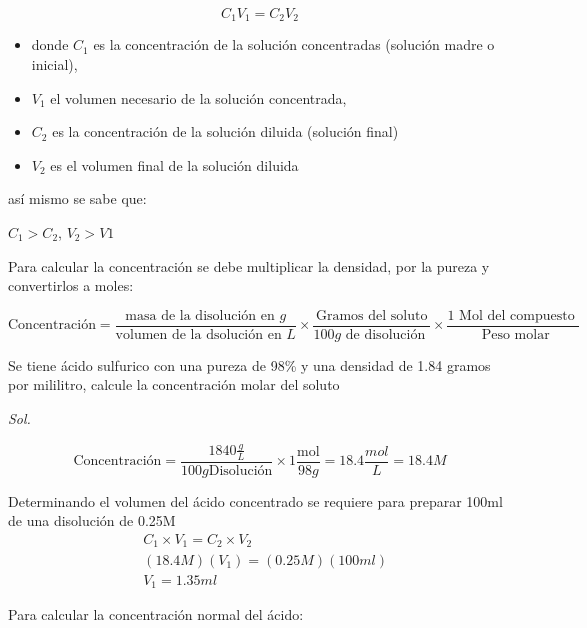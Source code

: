 \begin{equation}
	C_{1}V_{1}=C_{2}V_{2}
\end{equation}

\begin{itemize}
	\item donde $C_{1}$ es la concentración de la solución concentradas (solución madre o inicial),
	\item $V_{1}$ el volumen necesario de la solución concentrada,
	\item $C_{2}$ es la concentración de la solución diluida (solución final)
	\item $V_{2}$ es el volumen final de la solución diluida
\end{itemize}

así mismo se sabe que:

$C_{1}>C_{2}$, $V_{2}>V{1}$

Para calcular la concentración se debe multiplicar la densidad, por la pureza y convertirlos a moles:

\begin{equation}
	\text{Concentración}= \frac{\text{masa de la disolución en } g}{\text{volumen de la dsolución en } L}\times \frac{\text{Gramos del soluto}}{100g \text{ de disolución }} \times \frac{1 \text{ Mol del compuesto }}{\text{ Peso molar}}
\end{equation}

\begin{example}
	Se tiene ácido sulfurico con una pureza de 98\% y una densidad de 1.84 gramos por mililitro, calcule la concentración molar del soluto
\end{example}

\textit{ Sol. }

\begin{equation*}
	\text{Concentración}= \frac{1840 \frac{g}{L}}{100g \text{Disolución}} \times 1 \frac{\text{mol}}{98g}=18.4 \frac{mol}{L}=18.4M
\end{equation*}

Determinando el volumen del ácido concentrado se requiere para preparar 100ml de una disolución de 0.25M
\begin{align*}
	 & C_{1}\times V_{1}=C_{2}\times V_{2}                                       \\
	 & \left(18.4M\right)\left(V_{1}\right)=\left(0.25M\right)\left(100ml\right) \\
	 & V_{1}=1.35ml
\end{align*}

Para calcular la concentración normal del ácido:

